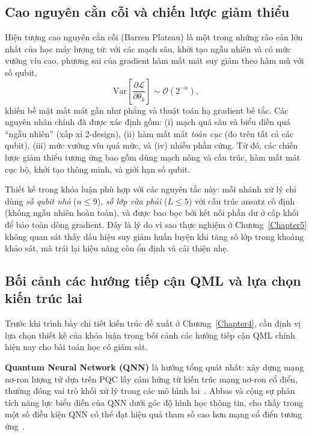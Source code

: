 \subsection{Cao nguyên cằn cỗi và chiến lược giảm thiểu}
\label{subsec:barren}
Hiện tượng cao nguyên cằn cỗi (Barren Plateau) \cite{mcclean2018barren} là một trong những rào cản lớn nhất của học máy lượng tử: với các mạch sâu, khởi tạo ngẫu nhiên và có mức vướng víu cao, phương sai của gradient hàm mất mát suy giảm theo hàm mũ với số qubit,
\begin{equation}
    \mathrm{Var}\!\left[\frac{\partial \mathcal{L}}{\partial \theta_k}\right] \sim \mathcal{O}(2^{-n}),
\end{equation}
khiến bề mặt mất mát gần như phẳng và thuật toán hạ gradient bế tắc. Các nguyên nhân chính đã được xác định gồm: (i) mạch quá sâu và biểu diễn quá ``ngẫu nhiên'' (xấp xỉ 2-design), (ii) hàm mất mát \emph{toàn cục} (đo trên tất cả các qubit), (iii) mức vướng víu quá mức, và (iv) nhiễu phần cứng. Từ đó, các chiến lược giảm thiểu tương ứng bao gồm dùng mạch nông và cấu trúc, hàm mất mát cục bộ, khởi tạo thông minh, và giới hạn số qubit.

Thiết kế trong khóa luận phù hợp với các nguyên tắc này: mỗi nhánh xử lý chỉ dùng \emph{số qubit nhỏ} ($n\le 9$), \emph{số lớp vừa phải} ($L\le 5$) với cấu trúc ansatz cố định (không ngẫu nhiên hoàn toàn), và được bao bọc bởi kết nối phần dư ở cấp khối để bảo toàn dòng gradient. Đây là lý do vì sao thực nghiệm ở Chương~\ref{Chapter5} không quan sát thấy dấu hiệu suy giảm huấn luyện khi tăng số lớp trong khoảng khảo sát, mà trái lại hiệu năng còn ổn định và cải thiện nhẹ.

\subsection{Bối cảnh các hướng tiếp cận QML và lựa chọn kiến trúc lai}
\label{subsec:qml_landscape}
Trước khi trình bày chi tiết kiến trúc đề xuất ở Chương~\ref{Chapter4}, cần định vị lựa chọn thiết kế của khóa luận trong bối cảnh các hướng tiếp cận QML chính hiện nay cho bài toán học có giám sát.

\textbf{Quantum Neural Network (QNN)} là hướng tổng quát nhất: xây dựng mạng nơ-ron lượng tử dựa trên PQC lấy cảm hứng từ kiến trúc mạng nơ-ron cổ điển, thường đóng vai trò khối xử lý trong các mô hình lai~\cite{farhi2018qnn}. Abbas và cộng sự phân tích năng lực biểu diễn của QNN dưới góc độ hình học thông tin, cho thấy trong một số điều kiện QNN có thể đạt hiệu quả tham số cao hơn mạng cổ điển tương ứng~\cite{abbas2021power}.


